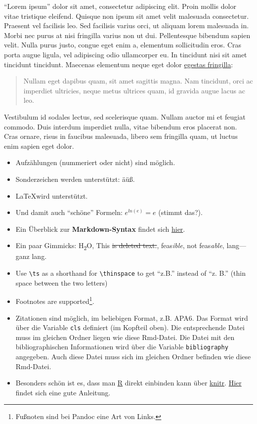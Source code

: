 \documentclass[11pt,ngerman,a4paper,oneside]{article}
\newcommand{\ts}{\thinspace}
\begin{document}
``Lorem ipsum'' dolor sit amet, consectetur adipiscing elit. Proin
mollis dolor vitae tristique eleifend. Quisque non ipsum sit amet velit
malesuada consectetur. Praesent vel facilisis leo. Sed facilisis varius
orci, ut aliquam lorem malesuada in. Morbi nec purus at nisi fringilla
varius non ut dui. Pellentesque bibendum sapien velit. Nulla purus
justo, congue eget enim a, elementum sollicitudin eros. Cras porta augue
ligula, vel adipiscing odio ullamcorper eu. In tincidunt nisi sit amet
tincidunt tincidunt. Maecenas elementum neque eget dolor
\href{http://example.com}{egestas fringilla}:

\begin{quote}
Nullam eget dapibus quam, sit amet sagittis magna. Nam tincidunt, orci
ac imperdiet ultricies, neque metus ultrices quam, id gravida augue
lacus ac leo.
\end{quote}

Vestibulum id sodales lectus, sed scelerisque quam. Nullam auctor mi et
feugiat commodo. Duis interdum imperdiet nulla, vitae bibendum eros
placerat non. Cras ornare, risus in faucibus malesuada, libero sem
fringilla quam, ut luctus enim sapien eget dolor.

\begin{itemize}
\item
  Aufzählungen (nummeriert oder nicht) sind möglich.
\item
  Sonderzeichen werden unterstützt: äüß.
\item
  \LaTeX wird unterstützt.
\item
  Und damit auch ``schöne'' Formeln: \(e^{ln(e)}=e\) (stimmt das?).
\item
  Ein Überblick zur \textbf{Markdown-Syntax} findet sich
  \href{http://pandoc.org/README.html\#pandocs-markdown}{hier}.
\item
  Ein paar Gimmicks: H\textsubscript{2}O, This \sout{is deleted text.},
  feas\emph{ible}, not feas\emph{able}, lang---ganz lang.
\item
  Use \texttt{\textbackslash{}ts} as a shorthand for
  \texttt{\textbackslash{}thinspace} to get ``z.\ts B.'' instead of ``z.
  B.'' (thin space between the two letters)
\item
  Footnotes are supported\footnote{Fußnoten sind bei Pandoc eine Art von
    Links.}.
\item
  Zitationen sind möglich, im beliebigen Format, z.B. APA6. Das Format
  wird über die Variable \texttt{cls} definiert (im Kopfteil oben). Die
  entsprechende Datei muss im gleichen Ordner liegen wie diese
  Rmd-Datei. Die Datei mit den bibliographischen Informationen wird über
  die Variable \texttt{bibliography} angegeben. Auch diese Datei muss
  sich im gleichen Ordner befinden wie diese Rmd-Datei.
\item
  Besonders schön ist es, dass man \href{https://cran.r-project.org}{R}
  direkt einbinden kann über \href{http://yihui.name/knitr/}{knitr}.
  \href{http://galahad.well.ox.ac.uk/repro/}{Hier} findet sich eine gute
  Anleitung.
\end{itemize}
\end{document}
